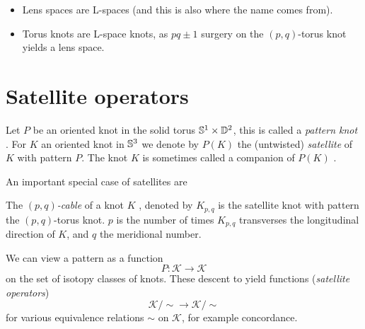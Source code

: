 \begin{example}
	\begin{itemize}
		\item Lens spaces are L-spaces (and this is also where the
		name comes from).
		
		\item Torus knots are L-space knots, as
		$pq \pm 1$ surgery on the $(p,q)$-torus knot yields a
		lens space. 
	\end{itemize}
\end{example}

\newpage
\section{Satellite operators}

\citep{cochran2014injectivity}

Let $P$ be an oriented knot in the solid torus $\mathbb{S}^{1} \times \mathbb{D}^{2}$,
this is called a \textit{pattern knot} .
For $K$ an oriented knot in $\mathbb{S}^{3}$ we denote by $P(K)$
the (untwisted) \textit{satellite}  of $K$
with pattern $P$. The knot $K$ is sometimes called
a companion
of $P(K)$ \citep[p. 10]{lickorish2012introduction}.

An important special case of satellites are
\begin{definition}[$(p,q)$-cables]
	The \textit{$(p,q)$-cable} of a knot $K$
	,
	denoted by $K_{p, q}$
	is the satellite knot with pattern the $(p, q)$-torus knot.
	$p$ is the number of times $K_{p, q}$ transverses
	the longitudinal direction of $K$,
	and $q$ the meridional number.
\end{definition}

We can view a pattern as a function
\begin{equation*}
	P \colon \mathcal{K} \rightarrow \mathcal{K}
\end{equation*}
on the set of isotopy classes of
knots.
These descent to yield functions (\textit{satellite operators})
\begin{equation*}
	\mathcal{K} / \sim \rightarrow \mathcal{K}/ \sim
\end{equation*}
for various equivalence relations $\sim$ on $\mathcal{K}$, for example
concordance.

